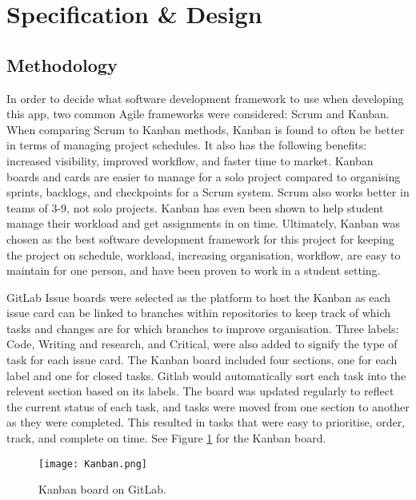 
\section{Specification \& Design}\label{process}

\subsection{Methodology}
In order to decide what software development framework to use when developing this app, two common Agile frameworks were considered: Scrum and Kanban. When comparing Scrum to Kanban methods, Kanban is found to often be better in terms of managing project schedules\cite{Lei2017}. It also has the following benefits: increased visibility, improved workflow, and faster time to market\cite{Ahmad2018}. Kanban boards and cards are easier to manage for a solo project compared to organising sprints, backlogs, and checkpoints for a Scrum system. Scrum also works better in teams of 3-9, not solo projects\cite{Mundra2013Practical}. Kanban has even been shown to help student manage their workload and get assignments in on time\cite{Sheng2021Kanban}. Ultimately, Kanban was chosen as the best software development framework for this project for keeping the project on schedule, workload, increasing organisation, workflow, are easy to maintain for one person, and have been proven to work in a student setting.

GitLab Issue boards were selected as the platform to host the Kanban as each issue card can be linked to branches within repositories to keep track of which tasks and changes are for which branches to improve organisation. Three labels: Code, Writing and research, and Critical, were also added to signify the type of task for each issue card. The Kanban board included four sections, one for each label and one for closed tasks. Gitlab would automatically sort each task into the relevent section based on its labels. The board was updated regularly to reflect the current status of each task, and tasks were moved from one section to another as they were completed. This resulted in tasks that were easy to prioritise, order, track, and complete on time. See Figure \ref{figure:kanban-board} for the Kanban board.

\begin{figure}[h!!]
  \begin{center}
    \texttt{[image: Kanban.png]}
    \caption{Kanban board on GitLab.}
    \label{figure:kanban-board}
  \end{center}
\end{figure}


